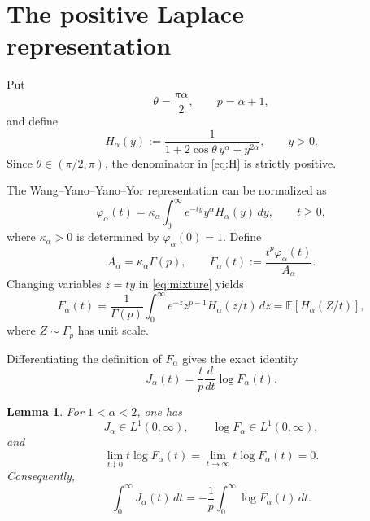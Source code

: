 \documentclass[11pt]{article}
\newtheorem{lemma}[theorem]{Lemma}
\theoremstyle{remark}
\newcommand{\E}{\mathbb{E}}
\begin{document}
\section{The positive Laplace representation}\label{sec:mixture}

Put
\[
 \theta=\frac{\pi\alpha}{2},
 \qquad
 p=\alpha+1,
\]
and define
\begin{equation}\label{eq:H}
 H_\alpha(y)
 :=\frac{1}
 {1+2\cos\theta\,y^\alpha+y^{2\alpha}},
 \qquad y>0.
\end{equation}
Since $\theta\in(\pi/2,\pi)$, the denominator in
\eqref{eq:H} is strictly positive.

The Wang--Yano--Yano--Yor representation can be normalized as
\begin{equation}\label{eq:mixture}
 \varphi_\alpha(t)
 =\kappa_\alpha\int_0^\infty
  e^{-ty}y^\alpha H_\alpha(y)\,dy,
 \qquad t\geq0,
\end{equation}
where $\kappa_\alpha>0$ is determined by
$\varphi_\alpha(0)=1$.  Define
\[
 A_\alpha=\kappa_\alpha\Gamma(p),
 \qquad
 F_\alpha(t)
 :=\frac{t^p\varphi_\alpha(t)}{A_\alpha}.
\]
Changing variables $z=ty$ in \eqref{eq:mixture} yields
\begin{equation}\label{eq:gamma-scaling}
 F_\alpha(t)
 =\frac1{\Gamma(p)}
  \int_0^\infty e^{-z}z^{p-1}
      H_\alpha(z/t)\,dz
 =\E[H_\alpha(Z/t)],
\end{equation}
where $Z\sim\Gamma_p$ has unit scale.

Differentiating the definition of $F_\alpha$ gives the exact identity
\begin{equation}\label{eq:J-logF}
 J_\alpha(t)
 =\frac{t}{p}\frac{d}{dt}\log F_\alpha(t).
\end{equation}

\begin{lemma}\label{lem:integrability}
For $1<\alpha<2$, one has
\[
 J_\alpha\in L^1(0,\infty),
 \qquad
 \log F_\alpha\in L^1(0,\infty),
\]
and
\[
 \lim_{t\downarrow0}t\log F_\alpha(t)
 =\lim_{t\to\infty}t\log F_\alpha(t)=0.
\]
Consequently,
\begin{equation}\label{eq:intJ}
 \int_0^\infty J_\alpha(t)\,dt
 =-\frac1p\int_0^\infty\log F_\alpha(t)\,dt.
\end{equation}
\end{lemma}
\end{document}
